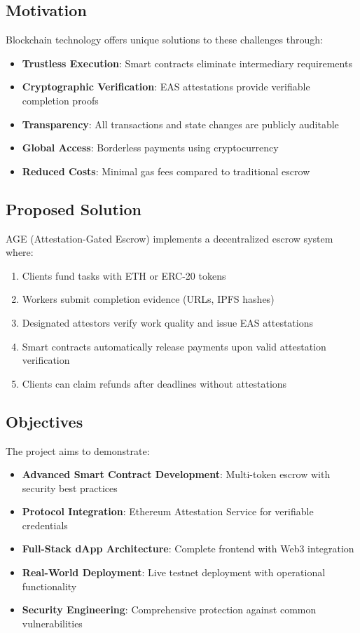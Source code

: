 \documentclass[12pt,a4paper]{article}
\begin{document}
\subsection{Motivation}

Blockchain technology offers unique solutions to these challenges through:
\begin{itemize}
    \item \textbf{Trustless Execution}: Smart contracts eliminate intermediary requirements
    \item \textbf{Cryptographic Verification}: EAS attestations provide verifiable completion proofs
    \item \textbf{Transparency}: All transactions and state changes are publicly auditable
    \item \textbf{Global Access}: Borderless payments using cryptocurrency
    \item \textbf{Reduced Costs}: Minimal gas fees compared to traditional escrow
\end{itemize}

\subsection{Proposed Solution}

AGE (Attestation-Gated Escrow) implements a decentralized escrow system where:
\begin{enumerate}
    \item Clients fund tasks with ETH or ERC-20 tokens
    \item Workers submit completion evidence (URLs, IPFS hashes)
    \item Designated attestors verify work quality and issue EAS attestations
    \item Smart contracts automatically release payments upon valid attestation verification
    \item Clients can claim refunds after deadlines without attestations
\end{enumerate}

\subsection{Objectives}

The project aims to demonstrate:
\begin{itemize}
    \item \textbf{Advanced Smart Contract Development}: Multi-token escrow with security best practices
    \item \textbf{Protocol Integration}: Ethereum Attestation Service for verifiable credentials
    \item \textbf{Full-Stack dApp Architecture}: Complete frontend with Web3 integration
    \item \textbf{Real-World Deployment}: Live testnet deployment with operational functionality
    \item \textbf{Security Engineering}: Comprehensive protection against common vulnerabilities
\end{itemize}
\end{document}
